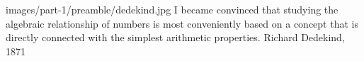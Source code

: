 {images/part-1/preamble/dedekind.jpg}
{
    I became convinced that studying the algebraic relationship of numbers is most conveniently based on a concept that is directly connected with the simplest arithmetic properties.
}
{Richard Dedekind, 1871}
{\cite[p.~66]{kleiner_2007}}
